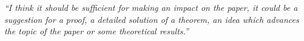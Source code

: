 \documentclass[12pt]{beamer}
\newcommand\ans[1]{{\it ``#1''}}
\newcommand\gap{\vspace{5mm}}
\begin{document}
\begin{frame}
  
\ans{I think it should be sufficient for making an impact on the paper, it could be a suggestion for a proof, a detailed solution of a theorem, an idea which advances the topic of the paper or some theoretical results.}


\gap




\end{frame}
\end{document}
